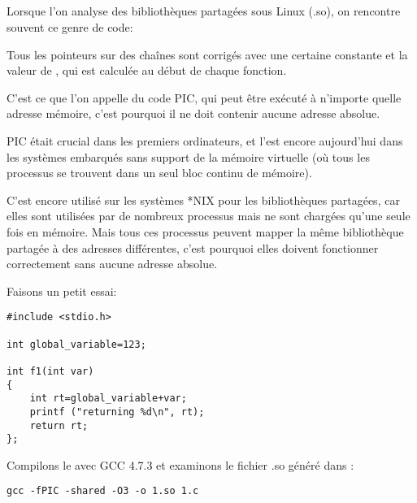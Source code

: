 \subsection{\CapitalPICcode}
\myindex{\PICcode}
\label{sec:PIC}

Lorsque l'on analyse des bibliothèques partagées sous Linux (.so), on rencontre souvent
ce genre de code:



Tous les pointeurs sur des chaînes sont corrigés avec une certaine constante et la valeur de \EBX,
qui est calculée au début de chaque fonction.

C'est ce que l'on appelle du code \ac{PIC}, qui peut être exécuté à n'importe quelle adresse mémoire, c'est pourquoi il ne doit contenir aucune adresse absolue.

\ac{PIC} était crucial dans les premiers ordinateurs, et l'est encore aujourd'hui dans les systèmes embarqués
sans support de la mémoire virtuelle (où tous les processus se trouvent dans un seul bloc continu de mémoire).

C'est encore utilisé sur les systèmes *NIX pour les bibliothèques partagées, car elles
sont utilisées par de nombreux processus mais ne sont chargées qu'une seule fois en mémoire.
Mais tous ces processus peuvent mapper la même bibliothèque partagée à des adresses différentes,
c'est pourquoi elles doivent fonctionner correctement sans aucune adresse absolue.


Faisons un petit essai:

\begin{lstlisting}[style=customc]
#include <stdio.h>

int global_variable=123;

int f1(int var)
{
    int rt=global_variable+var;
    printf ("returning %d\n", rt);
    return rt;
};
\end{lstlisting}

Compilons le avec GCC 4.7.3 et examinons le fichier .so généré dans \IDA:

\begin{lstlisting}
gcc -fPIC -shared -O3 -o 1.so 1.c
\end{lstlisting}



\newcommand{\retstring}{\IT{<<returning \%d\textbackslash{}n>>}}
\newcommand{\globvar}{\IT{global\_variable}}

